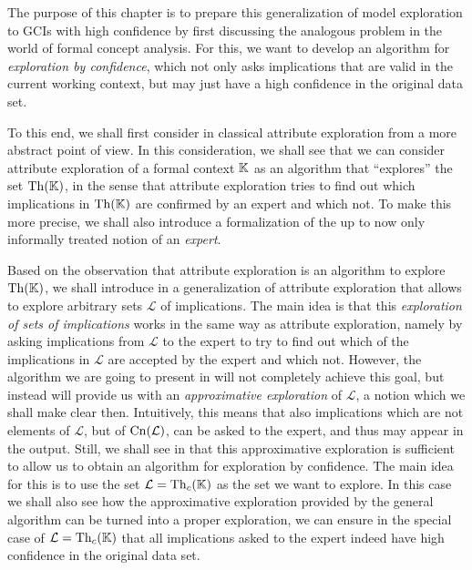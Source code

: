 The purpose of this chapter is to prepare this generalization of model exploration to GCIs
with high confidence by first discussing the analogous problem in the world of formal
concept analysis.  For this, we want to develop an algorithm for \emph{exploration by
  confidence}, which not only asks implications that are valid in the current working
context, but may just have a high confidence in the original data set.

To this end, we shall first consider in  classical attribute
exploration from a more abstract point of view.  In this consideration, we shall see that
we can consider attribute exploration of a formal context ${\mathbb{K}}$ as an algorithm that
\enquote{explores} the set $\operatorname{Th}({\mathbb{K}})$, in the sense that attribute exploration tries to
find out which implications in $\operatorname{Th}({\mathbb{K}})$ are confirmed by an expert and which not.  To
make this more precise, we shall also introduce a formalization of the up to now only
informally treated notion of an \emph{expert}.

Based on the observation that attribute exploration is an algorithm to explore $\operatorname{Th}({\mathbb{K}})$, we shall introduce in  a generalization of attribute
exploration that allows to explore arbitrary sets $\mathcal{L}$ of implications.  The main
idea is that this \emph{exploration of sets of implications} works in the same way as
attribute exploration, namely by asking implications from $\mathcal{L}$ to the expert to
try to find out which of the implications in $\mathcal{L}$ are accepted by the expert and
which not.  However, the algorithm we are going to present in 
will not completely achieve this goal, but instead will provide us with an
\emph{approximative exploration} of $\mathcal{L}$, a notion which we shall make clear
then.  Intuitively, this means that also implications which are not elements of
$\mathcal{L}$, but of $\operatorname{Cn}(\mathcal{L})$, can be asked to the expert, and thus may appear
in the output.  Still, we shall see in  that this approximative
exploration is sufficient to allow us to obtain an algorithm for exploration by
confidence.  The main idea for this is to use the set $\mathcal{L} = \operatorname{Th}_{c}({\mathbb{K}})$ as
the set we want to explore.  In this case we shall also see how the approximative
exploration provided by the general algorithm can be turned into a proper exploration, \ie
we can ensure in the special case of $\mathcal{L} = \operatorname{Th}_{c}({\mathbb{K}})$ that all implications
asked to the expert indeed have high confidence in the original data set.

